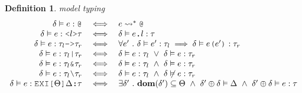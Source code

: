 \documentclass[table,dvipsnames,acmsmall]{acmart}
\theoremstyle{definition}
\newtheorem{definition}{Definition}[section]
\begin{document}


\begin{definition}
  \label{def:model_typing}
  \emph{model typing}
  \hfill
  \small
  \nopad
  \[
  \begin{array}[t]{rclcl}
      \delta \satisfies e \hastype \J{@}
      &\iff& 
      e \rightsquigarrow^* \J{@}

      \\

      \delta \satisfies e \hastype \J{<} l \J{>} \tau
      &\iff& 
      \delta \satisfies e\J{.}l \hastype \tau 

      \\

      \delta \satisfies e \hastype \tau_l \J{->} \tau_r
      &\iff& 
      \forall e' \qua
      \delta \satisfies e' \hastype \tau_l 
      \implies
      \delta \satisfies e\J{(}e'\J{)} \hastype \tau_r

      \\

      \delta \satisfies e \hastype \tau_l \J{|} \tau_r 
      &\iff& 
      \delta \satisfies e \hastype \tau_l
      \down
      \delta \satisfies e \hastype \tau_r

      \\

      \delta \satisfies e \hastype \tau_l \J{\&} \tau_r 
      &\iff& 
      \delta \satisfies e \hastype \tau_l
      \up
      \delta \satisfies e \hastype \tau_r

      \\

      \delta \satisfies e \hastype \tau_l \typdiff \tau_r
      &\iff& 
      \delta \satisfies e \hastype \tau_l
      \up
      \delta \not\satisfies e \hastype \tau_r

      \\

      \delta \satisfies e \hastype \J{EXI[}\Theta\J{]}\Delta \J{:} \tau
      &\iff& 
      \exists \delta' \qua
      \textbf{dom}(\delta') \subseteq \Theta
      \up
      \delta' \oplus \delta \satisfies \Delta 
      \up
      \delta' \oplus \delta \satisfies e \hastype \tau


\end{array}\]
\end{definition}
\end{document}
